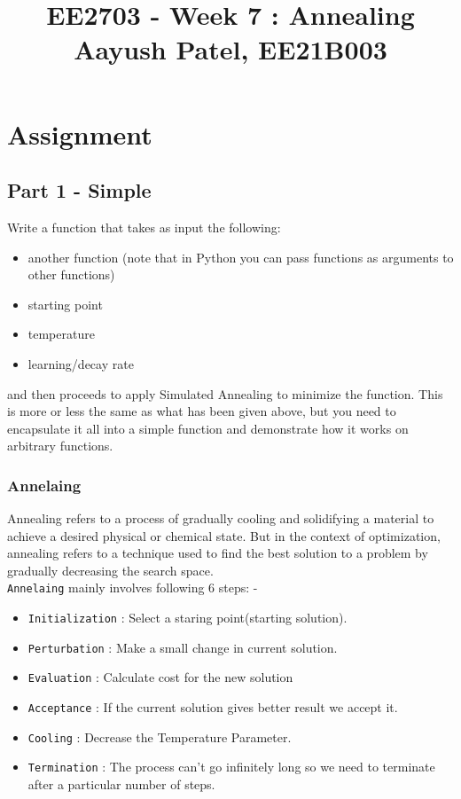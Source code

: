 \documentclass[11pt]{article}
\title{EE2703 - Week 7 : Annealing\\
Aayush Patel, EE21B003}
\providecommand{\tightlist}{%
      \setlength{\itemsep}{0pt}\setlength{\parskip}{0pt}}
\begin{document}
    
    \maketitle
    
    

    
    \hypertarget{assignment}{%
\section{Assignment}\label{assignment}}

\hypertarget{part-1---simple}{%
\subsection{Part 1 - Simple}\label{part-1---simple}}

Write a function that takes as input the following:

\begin{itemize}
\tightlist
\item
  another function (note that in Python you can pass functions as
  arguments to other functions)
\item
  starting point
\item
  temperature
\item
  learning/decay rate
\end{itemize}

and then proceeds to apply Simulated Annealing to minimize the function.
This is more or less the same as what has been given above, but you need
to encapsulate it all into a simple function and demonstrate how it
works on arbitrary functions.

    \hypertarget{annelaing}{%
\subsubsection{Annelaing}\label{annelaing}}

Annealing refers to a process of gradually cooling and solidifying a
material to achieve a desired physical or chemical state. But in the
context of optimization, annealing refers to a technique used to find
the best solution to a problem by gradually decreasing the search space.\\
\texttt{Annelaing} mainly involves following 6 steps: -
\begin{itemize}
    \item 
\texttt{Initialization} : Select a staring point(starting solution).
    \item
\texttt{Perturbation} : Make a small change in current solution. 
    \item
\texttt{Evaluation} : Calculate cost for the new solution 
    \item
\texttt{Acceptance} : If the current solution gives better result we
accept it. 
    \item
 \texttt{Cooling} : Decrease the Temperature Parameter. 
    \item
\texttt{Termination} : The process can't go infinitely long so we need
to terminate after a particular number of steps.
\end{itemize}
\end{document}
